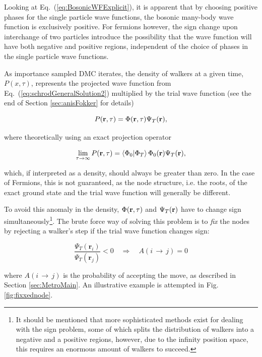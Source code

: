 Looking at Eq.~(\ref{eq:BosonicWFExplicit}), it is apparent that by choosing positive phases for the single particle wave functions, the bosonic many-body wave function is exclusively positive. For fermions however, the sign change upon interchange of two particles introduce the possibility that the wave function will have both negative and positive regions, independent of the choice of phases in the single particle wave functions.

As importance sampled DMC iterates, the density of walkers at a given time, $P(x, \tau)$, represents the projected wave function from Eq.~(\ref{eq:schrodGeneralSolution2}) multiplied by the trial wave function (see the end of Section \ref{sec:anisFokker} for details)

\begin{equation}
 P(\mathbf{r}, \tau) = \Phi(\mathbf{r}, \tau)\Psi_T(\mathbf{r}),
\end{equation}

where theoretically using an exact projection operator

\begin{equation}
  \lim_{\tau\to\infty} P(\mathbf{r}, \tau) = \left\langle \Phi_0 | \Phi_T\right\rangle\Phi_0(\mathbf{r})\Psi_T(\mathbf{r}),
\end{equation}

which, if interpreted as a density, should always be greater than zero. In the case of Fermions, this is not guaranteed, as
the node structure, i.e. the roots, of the exact ground state and the trial wave function will generally be different.  

To avoid this anomaly in the density, $\Phi(\mathbf{r}, \tau)$ and $\Psi_T(\mathbf{r})$ have to change sign simultaneously\footnote{It should be mentioned that more sophisticated methods exist for dealing with the sign problem, some of which splits the distribution of walkers into a negative and a positive regions, however, due to the infinity position space, this requires an enormous amount of walkers to succeed.}. The brute force way of solving this problem is to \textit{fix} the nodes by rejecting a walker's step if the trial wave function changes sign:

\begin{equation}
\frac{\Psi_T(\mathbf{r}_i)}{\Psi_T(\mathbf{r}_j)} < 0 \quad\Longrightarrow\quad A(i\,\rightarrow\,j) = 0
\end{equation}

where $A(i\,\rightarrow\,j)$ is the probability of accepting the move, as described in Section \ref{sec:MetroMain}. An illustrative example is attempted in Fig. \ref{fig:fixxednode}.

